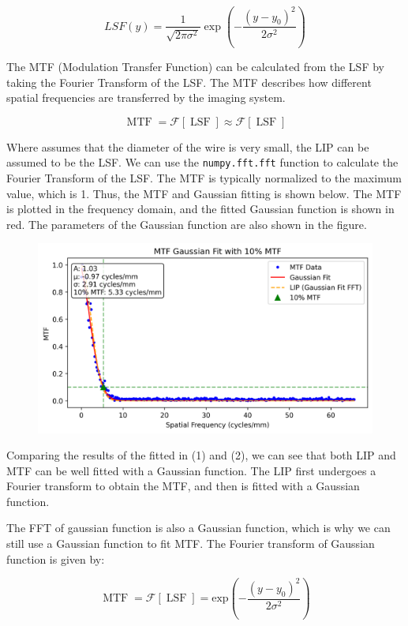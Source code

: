 \documentclass[12pt, a4paper, oneside]{ctexart}
\begin{document}
\[LSF(y) = \frac{1}{\sqrt{2\pi\sigma^2}} \exp\left(-\frac{(y - y_0)^2}{2\sigma^2}\right)\]


The MTF (Modulation Transfer Function) can be calculated from the LSF by taking the Fourier Transform of the LSF.  The MTF describes how different spatial frequencies are transferred by the imaging system.


\[
\operatorname {MTF} ={\mathcal {F}}\left[\operatorname {LSF} \right]
\approx {\mathcal {F}}\left[\operatorname {LSF} \right]
\]

Where assumes that the diameter of the wire is very small, the LIP can be assumed to be the LSF. We can use the \texttt{numpy.fft.fft} function to calculate the Fourier Transform of the LSF. The MTF is typically normalized to the maximum value, which is 1. Thus, the MTF and Gaussian fitting is shown below. The MTF is plotted in the frequency domain, and the fitted Gaussian function is shown in red. The parameters of the Gaussian function are also shown in the figure.

\begin{figure}[htp]
	\centering
	\includegraphics[width=1\textwidth]{./result/mtf_gaussian_fit.png}

\end{figure}

Comparing the results of the fitted in (1) and (2), we can see that both LIP and MTF can be well fitted with a Gaussian function. The LIP first undergoes a Fourier transform to obtain the MTF, and then is fitted with a Gaussian function. 

The FFT of gaussian function is also a Gaussian function, which is why we can still use a Gaussian function to fit MTF. The Fourier transform of  Gaussian function is given by:

\[
	\operatorname {MTF} ={\mathcal {F}}\left[\operatorname {LSF} \right]=\text{exp}\left(-\frac{(y - y_0)^2}{2\sigma^2}\right)
\]
\end{document}
